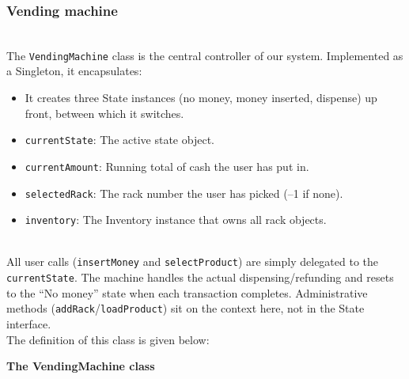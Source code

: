 \subsubsection{Vending machine}\label{d6DcwCJ0jKUAiX5iUpOvw-4}
\\
The \texttt{VendingMachine} class is the central controller of our system. Implemented as a Singleton, it encapsulates:

\begin{itemize}
\item
\protect{}\label{I2_LmUI-fcO3WTcigp0UY}
It creates three State instances (no money, money inserted, dispense) up front, between which it switches.
\item
\protect{}\label{q9I7CCw1bQ6Q71KOx5y3m}
\texttt{currentState}: The active state object.
\item
\protect{}\label{PK4RzOQAx882gqYxVewah}
\texttt{currentAmount}: Running total of cash the user has put in.
\item
\protect{}\label{XiMzv8woBmEbOI9Un4OF0}
\texttt{selectedRack}: The rack number the user has picked (--1 if none).
\item
\protect{}\label{bO9j4UbkMOlC2W1TaqXfx}
\texttt{inventory}: The Inventory instance that owns all rack objects.
\end{itemize}
\\
All user calls (\texttt{insertMoney} and \texttt{selectProduct}) are simply delegated to the \texttt{currentState}. The machine handles the actual dispensing/refunding and resets to the ``No money'' state when each transaction completes. Administrative methods (\texttt{addRack}/\texttt{loadProduct}) sit on the context here, not in the State interface.
\\
The definition of this class is given below:

\textbf{The VendingMachine class}

